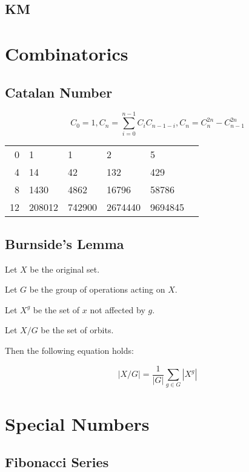 \documentclass[a4paper,10pt,twocolumn,oneside]{article}
\begin{document}
\subsection{KM}


\section{Combinatorics}

\subsection{Catalan Number}
$$
C_0=1, C_n=\sum_{i=0}^{n-1} C_i C_{n-1-i}, C_n=C_n^{2n}-C_{n-1}^{2n}
$$

\begin{center}
    \begin{tabular}{r|lllll}
        0 & 1 & 1 & 2 & 5 \\
        4 & 14 & 42 & 132 & 429 \\
        8 & 1430 & 4862 & 16796 & 58786 \\
        12 & 208012 & 742900 & 2674440 & 9694845
    \end{tabular}
\end{center}

\subsection{Burnside's Lemma}
{\normalsize
Let $X$ be the original set.

Let $G$ be the group of operations acting on $X$.

Let $X^g$ be the set of $x$ not affected by $g$.

Let $X/G$ be the set of orbits.

Then the following equation holds:

$$
|X/G| = \frac{1}{|G|} \sum_{g \in G} |X^g|
$$
}

\section{Special Numbers}

\subsection{Fibonacci Series}
\end{document}
